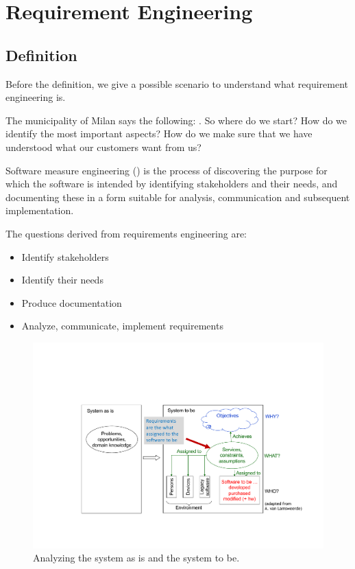 \section{Requirement Engineering}

\subsection{Definition}

Before the definition, we give a possible scenario to understand what requirement engineering is.

\highspace
The municipality of Milan says the following: . So where do we start? How do we identify the most important aspects? How do we make sure that we have understood what our customers want from us?

\begin{definitionbox}
    Software measure engineering () is the process of discovering the purpose for which the software is intended by identifying stakeholders and their needs, and documenting these in a form suitable for analysis, communication and subsequent implementation.
\end{definitionbox}

\noindent
The questions derived from requirements engineering are:
\begin{itemize}
    \item Identify stakeholders
    \item Identify their needs
    \item Produce documentation
    \item Analyze, communicate, implement requirements
\end{itemize}

\begin{figure}[!htp]
    \centering
    \includegraphics[width=\textwidth]{img/requirement-engineering-1.pdf}
    \caption{Analyzing the system as is and the system to be.}
\end{figure}